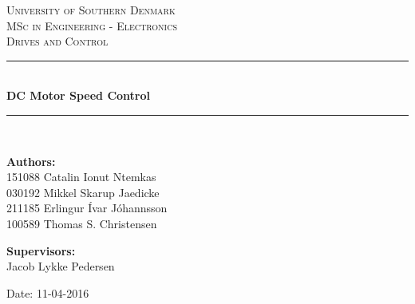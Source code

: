 \begin{titlepage}
\begin{center}

\textsc{\LARGE University of Southern Denmark}\\[1.5cm]
\textsc{\Large MSc in Engineering - Electronics}\\
\textsc{\large Drives and Control}\\[0.5cm]
\vfill
\hrule ~\\[0.3cm]
{ \huge \bfseries DC Motor Speed Control\\[0.4cm] }
\hrule ~\\[1.5cm]
\vfill

\begin{minipage}[t]{.49\textwidth}
\begin{flushleft} \large
\textbf{Authors:}\\
151088 Catalin Ionut Ntemkas\\
030192 Mikkel Skarup Jaedicke\\
211185 Erlingur Ívar Jóhannsson\\
100589 Thomas S. Christensen
\end{flushleft}
\end{minipage}
\begin{minipage}[t]{.49\textwidth}
\begin{flushright} \large
\textbf{Supervisors:} \\
Jacob Lykke Pedersen\\
\end{flushright}
\end{minipage}

\vspace{1.2cm}
Date: 11-04-2016

\end{center}
\end{titlepage}